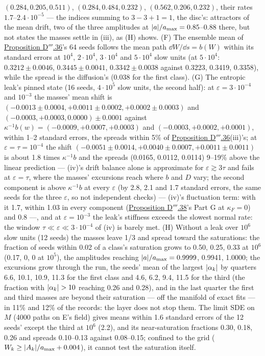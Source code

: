 \begin{sloppypar}
$(0.284, 0.205, 0.511)$, $(0.284, 0.484, 0.232)$, $(0.562, 0.206, 0.232)$, their rates
$1.7$--$2.4\cdot10^{-5}$ --- the indices summing to $3 - 3 + 1 = 1$, the disc's: attractors of the mean drift, two of
the three amplitudes at $\lvert a\rvert/a_{\max} = 0.85$--$0.88$ there, but not states the masses settle in (iii), as (H)
shows. (F) The ensemble mean of \hyperref[res:thmDppp:36]{Proposition D$'''$.36}'s 64 seeds follows the mean path
$\dd W/\dd s = b(W)$ within its standard errors at $10^4$, $2\cdot10^4$, $3\cdot10^4$ and $5\cdot10^4$ slow units (at
$5\cdot10^4$: $0.3212\pm0.0046$, $0.3445\pm0.0041$, $0.3342\pm0.0038$ against 0.3223, 0.3419, 0.3358), while the spread
is the diffusion's (0.038 for the first class). (G) The entropic leak's pinned state (16 seeds, $4\cdot10^5$ slow units,
the second half): at $\varepsilon = 3\cdot10^{-4}$ and $10^{-3}$ the masses' mean shift is
$(-0.0013\pm0.0004, +0.0011\pm0.0002, +0.0002\pm0.0003)$ and $(-0.0003, +0.0003, 0.0000)\pm0.0001$ against
$\kappa^{-1}b(w) = (-0.0009, +0.0007, +0.0003)$ and $(-0.0003, +0.0002, +0.0001)$, within 1--2 standard errors, the
spreads within 5\% of \hyperref[res:thmDppp:36]{Proposition D$'''$.36}(iii)'s; at $\varepsilon = \tau = 10^{-4}$ the
shift $(-0.0051\pm0.0014, +0.0040\pm0.0007, +0.0011\pm0.0011)$ is about 1.8 times $\kappa^{-1}b$ and the spreads
(0.0165, 0.0112, 0.0114) 9--19\% above the linear prediction --- (iv)'s drift balance alone is approximate for
$\varepsilon\gtrsim3\tau$ and fails at $\varepsilon = \tau$, where the masses' excursions reach where $b$ and $D$ vary;
the second component is above $\kappa^{-1}b$ at every $\varepsilon$ (by 2.8, 2.1 and 1.7 standard errors, the same
seeds for the three $\varepsilon$, so not independent checks) --- (iv)'s fluctuation term: with it 1.7, within 1.03
in every component (\hyperref[res:thmDppp:38]{Proposition D$'''$.38}'s Part G at $\kappa_F = 0$) and 0.8 ---, and at $\varepsilon = 10^{-3}$ the leak's stiffness
exceeds the slowest normal rate: the window $\tau\ll\varepsilon\ll3\cdot10^{-4}$ of (iv) is barely met. (H) Without a
leak over $10^6$ slow units (12 seeds) the masses leave 1/3 and spread toward the saturations: the fraction of seeds
within 0.02 of a class's saturation grows to 0.50, 0.25, 0.33 at $10^6$ (0.17, 0, 0 at $10^5$), the amplitudes reaching
$\lvert a\rvert/a_{\max} = 0.9999$, 0.9941, 1.0000; the excursions grow through the run, the seeds' mean of the largest
$\lvert \alpha_k\rvert$ by quarters 6.6, 10.1, 10.9, 11.3 for the first class and 4.6, 6.2, 9.4, 11.5 for the third (the
fraction with $\lvert \alpha_k\rvert > 10$ reaching 0.26 and 0.28), and in the last quarter the first and third masses are
beyond their saturation --- off the manifold of exact fits --- in 11\% and 12\% of the records: the layer does not stop
them. The limit SDE on $M$ (4000 paths on E's field) gives means within 1.6 standard errors of the 12 seeds' except the
third at $10^6$ (2.2), and its near-saturation fractions 0.30, 0.18, 0.26 and spreads 0.10--0.13 against 0.08--0.15;
confined to the grid ($W_k\ge\lvert A_k\rvert/a_{\max} + 0.004$), it cannot test the saturation itself.
\end{sloppypar}

